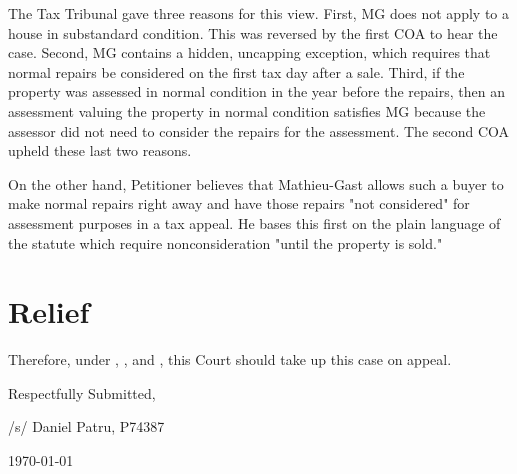 \documentclass[12pt,\documentclassflag]{michiganCourtOfAppealsBrief}
\begin{document}
The Tax Tribunal gave three reasons for this view. First, MG does not apply to a house in substandard condition. This was reversed by the first COA to hear the case. Second, MG contains a hidden, uncapping exception, which requires that normal repairs be considered on the first tax day after a sale. Third, if the property was assessed in normal condition in the year before the repairs, then an assessment valuing the property in normal condition satisfies MG because the assessor did not need to consider the repairs for the assessment. The second COA upheld these last two reasons.

On the other hand, Petitioner believes that Mathieu-Gast allows such a buyer to make normal repairs right away and have those repairs "not considered" for assessment purposes in a tax appeal. He bases this first on the plain language of the statute which require nonconsideration "until the property is sold."

 


\section{Relief}

Therefore, under \cite{MCR 7.305(B)(3)}, \cite{MCR 7.305(B)(5a)}, and \cite{MCR 7.305(B)(5b)}, this Court should take up this case on appeal.



\vspace{1\baselineskip}

{ \setlength{\leftskip}{3.5in}
  Respectfully Submitted,

  /s/ Daniel Patru, P74387

\today

  \setlength{\leftskip}{0pt}}


\newpage\empty%

\end{document}
